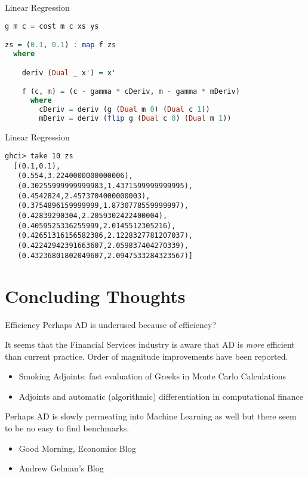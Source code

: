 \documentclass{beamer}
\begin{document}
\begin{frame}[fragile]{Linear Regression}
\begin{scriptsize}
\begin{lstlisting}[language=Haskell]
g m c = cost m c xs ys

zs = (0.1, 0.1) : map f zs
  where

    deriv (Dual _ x') = x'

    f (c, m) = (c - gamma * cDeriv, m - gamma * mDeriv)
      where
        cDeriv = deriv (g (Dual m 0) (Dual c 1))
        mDeriv = deriv (flip g (Dual c 0) (Dual m 1))
\end{lstlisting}
\end{scriptsize}
\end{frame}

\begin{frame}[fragile]{Linear Regression}
\begin{scriptsize}
\begin{lstlisting}
ghci> take 10 zs
  [(0.1,0.1),
   (0.554,3.2240000000000006),
   (0.30255999999999983,1.4371599999999995),
   (0.4542824,2.4573704000000003),
   (0.3754896159999999,1.8730778559999997),
   (0.42839290304,2.2059302422400004),
   (0.4059525336255999,2.0145512305216),
   (0.42651316156582386,2.1228327781207037),
   (0.42242942391663607,2.059837404270339),
   (0.43236801802049607,2.0947533284323567)]
\end{lstlisting}
\end{scriptsize}
\end{frame}

\section{Concluding Thoughts}

\begin{frame}[fragile]{Efficiency}
Perhaps AD is underused because of efficiency?

It seems that the Financial Services industry is aware that AD is {\em
  more} efficient than current practice. Order of magnitude
improvements have been reported.
\begin{itemize}
\item
Smoking Adjoints: fast evaluation of Greeks in Monte Carlo Calculations
\item
Adjoints and automatic (algorithmic) differentiation in computational finance
\end{itemize}

Perhaps AD is slowly permeating into Machine Learning as well but
there seem to be no easy to find benchmarks.

\begin{itemize}
\item
Good Morning, Economics Blog
\item
Andrew Gelman's Blog
\end{itemize}
\end{frame}
\end{document}

